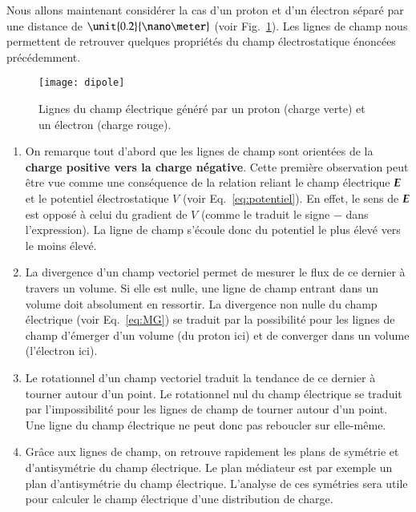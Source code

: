 Nous allons maintenant considérer la cas d'un proton et d'un électron séparé 
par une distance de $\unit{0.2}{\nano \meter}$ (voir Fig.~\ref{fig:dipole}).
Les lignes de champ nous permettent de retrouver quelques propriétés du champ 
électrostatique énoncées précédemment.

\begin{figure}[h!]
	\centering
	\texttt{[image: dipole]}
	\caption{Lignes du champ électrique généré par un proton (charge verte) et 
	         un électron (charge rouge).}%
	\label{fig:dipole}
\end{figure}

\begin{enumerate}
	\item On remarque tout d'abord que les lignes de champ sont orientées 
	  de la \textbf{charge positive vers la charge négative}. Cette première 
	  observation peut être vue comme une conséquence de la relation reliant 
	  le champ électrique $\vece$ et le potentiel électrostatique $V$ 
	  (voir Eq.~\ref{eq:potentiel}). En effet, le sens de $\vece$ est 
	  opposé à celui du gradient de $V$ (comme le traduit le signe $-$ dans 
	  l'expression).
	  La ligne de champ s'écoule donc du potentiel le plus élevé 
	  vers le moins élevé.
      \item La divergence d'un champ vectoriel permet de mesurer
	    le flux de ce dernier à travers un volume. Si elle est nulle, 
	    une ligne de champ entrant dans un volume doit absolument en ressortir.
	    La divergence non nulle du champ électrique (voir Eq.~\ref{eq:MG})
	    se traduit par la possibilité pour les lignes de champ d'émerger d'un 
	    volume (du proton ici) et de converger dans un volume (l'électron ici).

	    \item Le rotationnel d'un champ vectoriel traduit la tendance de ce dernier
	    à tourner autour d'un point.
	    Le rotationnel nul du champ électrique se traduit par l'impossibilité
	    pour les lignes de champ de tourner autour d'un point. Une ligne du champ
	    électrique ne peut donc pas reboucler sur elle-même.

    	   \item Grâce aux lignes de champ, on retrouve rapidement les plans de 
		 symétrie et d'antisymétrie du champ électrique. Le plan médiateur 
		 est par exemple un plan d'antisymétrie du champ électrique. 
		 L'analyse de ces symétries sera utile pour calculer le champ
		 électrique d'une distribution de charge.
\end{enumerate}

